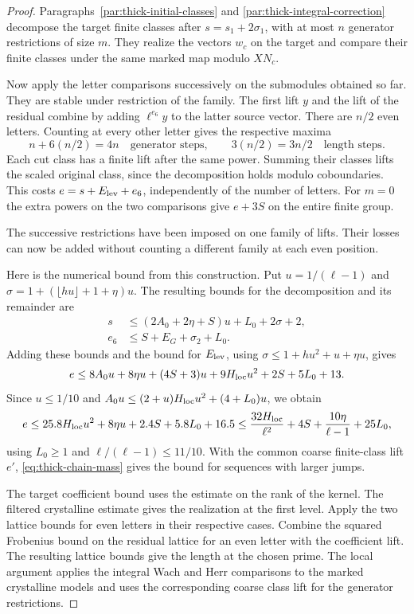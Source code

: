 \begin{proof}
Paragraphs~\ref{par:thick-initial-classes} and
\ref{par:thick-integral-correction} decompose the target finite
classes after \(s=s_1+2\sigma_1\), with at most \(n\) generator
restrictions of size \(m\). They realize the vectors \(w_c\)
on the target and compare their finite classes under the
same marked map modulo \(XN_c\).

Now apply the letter
comparisons successively on the submodules obtained so far.
They are stable under restriction
of the family. The first lift \(y\) and the lift of the residual
combine by adding \(\ell^{e_6}y\) to the latter source vector. There
are \(n/2\) even letters. Counting at every other letter gives the respective maxima
\[
 n+6(n/2)=4n\quad\text{generator steps},\qquad 3(n/2)=3n/2\quad\text{length steps}.
\]
Each cut class has a finite lift after the same power.
Summing their classes lifts the scaled original class, since the
decomposition holds modulo coboundaries. This costs
\(e=s+E_{\rm lev}+e_6\), independently of the number of letters.
For \(m=0\) the extra powers on the two comparisons give \(e+3S\)
on the entire finite group.

The successive restrictions have been imposed on one family of lifts. Their losses can now be added without counting a different family at each even position.

Here is the numerical bound from this construction. Put
\(u=1/(\ell-1)\) and
\(\sigma=1+(\lfloor hu\rfloor+1+\eta)u\).
The resulting bounds for the decomposition and its remainder are
\[
\begin{aligned}
 s&\le(2A_0+2\eta+S)u+L_0+2\sigma+2,\\
 e_6&\le S+E_G+\sigma_2+L_0 .
\end{aligned}
\]
Adding these bounds and the bound for \(E_{\rm lev}\), using
\(\sigma\le1+hu^2+u+\eta u\), gives
\[
 e\le 8A_0u+8\eta u+(4S+3)u+9H_{\rm loc}u^2+2S+5L_0+13 .
\]
Since \(u\le1/10\) and
\(A_0u\le (2+u)H_{\rm loc}u^2+(4+L_0)u\), we obtain
\[
 e\le25.8H_{\rm loc}u^2+8\eta u+2.4S+5.8L_0+16.5
   \le \frac{32H_{\rm loc}}{\ell^2}+4S+
              \frac{10\eta}{\ell-1}+25L_0 ,
\]
using \(L_0\ge1\) and \(\ell/(\ell-1)\le 11/10\).
With the common coarse finite-class lift \(e'\),
\eqref{eq:thick-chain-mass} gives the bound for sequences with larger jumps.

The target coefficient bound uses the estimate on the rank of the kernel. The filtered crystalline estimate gives the realization at the first level. Apply the two lattice bounds for even letters in their respective cases.
 Combine the squared Frobenius bound on the residual lattice for an even letter with the coefficient lift.
 The resulting lattice bounds give the length at the chosen prime.
The local argument applies the integral Wach and Herr comparisons
to the marked crystalline models and uses the corresponding
coarse class lift for the generator restrictions.
\end{proof}


